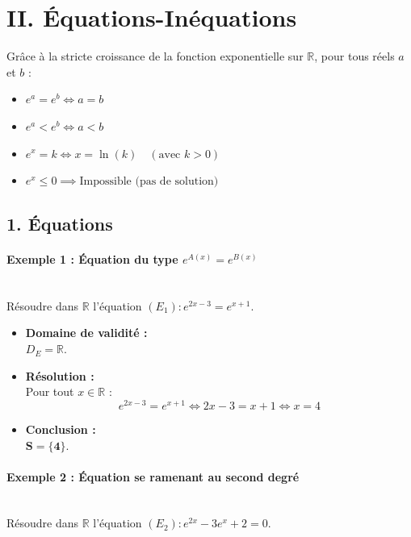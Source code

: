 \documentclass[12pt,a4paper]{article}
\begin{document}

\section*{\color{myred}II. Équations-Inéquations}
Grâce à la stricte croissance de la fonction exponentielle sur $\mathbb{R}$, pour tous réels $a$ et $b$ :
\begin{itemize}
    \item $e^a = e^b \iff a = b$
    \item $e^a < e^b \iff a < b$
    \item $e^x = k \iff x = \ln(k) \quad (\text{avec } k > 0)$
    \item $e^x \le 0 \implies \text{Impossible (pas de solution)}$
\end{itemize}

\subsection*{\color{myred}1. Équations}

\paragraph{Exemple 1 : Équation du type $e^{A(x)} = e^{B(x)}$}\mbox{}\\[2mm]
Résoudre dans $\mathbb{R}$ l'équation $(E_1) : e^{2x - 3} = e^{x + 1}$.

\begin{itemize}
    \item \textbf{Domaine de validité :}\\ $D_E = \mathbb{R}$.
    \item \textbf{Résolution :}\\
    Pour tout $x \in \mathbb{R}$ :
    \[
    e^{2x - 3} = e^{x + 1} \iff 2x - 3 = x + 1 \iff x = 4
    \]
    \item \textbf{Conclusion :}\\ $\mathbf{S = \{4\}}$.
\end{itemize}

\paragraph{Exemple 2 : Équation se ramenant au second degré}\mbox{}\\[2mm]
Résoudre dans $\mathbb{R}$ l'équation $(E_2) : e^{2x} - 3e^x + 2 = 0$.
\end{document}

